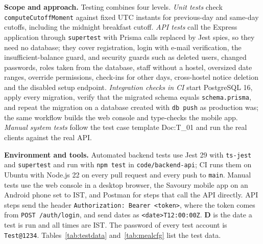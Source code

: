 \documentclass[11pt,a4paper]{article}
\begin{document}
\textbf{Scope and approach.} Testing combines four levels.
\emph{Unit tests} check \texttt{computeCutoffMoment} against fixed UTC instants
for previous-day and same-day cutoffs, including the midnight breakfast cutoff.
\emph{API tests} call the Express application through \texttt{supertest} with
Prisma calls replaced by Jest spies, so they need no database; they cover
registration, login with e-mail verification, the insufficient-balance guard,
and security guards such as deleted users, changed passwords, roles taken from
the database, staff without a hostel, oversized date ranges, override
permissions, check-ins for other days, cross-hostel notice deletion and the
disabled setup endpoint. \emph{Integration checks in CI} start PostgreSQL 16,
apply every migration, verify that the migrated schema equals
\texttt{schema.prisma}, and repeat the migration on a database created with
\texttt{db push} as production was; the same workflow builds the web console and
type-checks the mobile app. \emph{Manual system tests} follow the test case
template Doc:T\_01 and run the real clients against the real API.

\textbf{Environment and tools.} Automated backend tests use Jest 29 with
\texttt{ts-jest} and \texttt{supertest} and run with \texttt{npm test} in
\texttt{code/backend-api}; CI runs them on Ubuntu with Node.js 22 on every pull
request and every push to \texttt{main}. Manual tests use the web console in a
desktop browser, the Savoury mobile app on an Android phone set to IST, and
Postman for steps that call the API directly. API steps send the header
\texttt{Authorization: Bearer <token>}, where the token comes from
\texttt{POST /auth/login}, and send dates as \texttt{<date>T12:00:00Z}. \textbf{D}
is the date a test is run and all times are IST. The password of every test
account is \texttt{Test@1234}. Tables~\ref{tab:testdata} and~\ref{tab:mealcfg}
list the test data.
\end{document}
